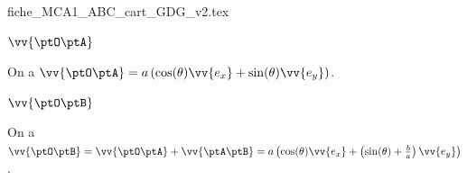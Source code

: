 \initialisationPartieDroite %
\begin{center}
	{fiche_MCA1_ABC_cart_GDG_v2.tex}
\end{center}
\finalisationDuPartageDePage %


\debutEntrainement



\begin{enonce}
	$\vv{\ptO \ptA}$
\end{enonce}


\begin{corrige}
	On a $\vv{\ptO \ptA} = a \left(\cos(\theta) \vv{e_x}+\sin(\theta) \vv{e_y}\right)$.
\end{corrige}





\begin{enonce}
	$\vv{\ptO \ptB}$ 
\end{enonce}


\begin{corrige}
	On a $\vv{\ptO \ptB} =\vv{\ptO \ptA}+\vv{\ptA \ptB}= a \left(\cos(\theta) \vv{e_x}+\left(\sin(\theta)+\frac{b}{a}\right)\vv{e_y}\right)$.
\end{corrige}




